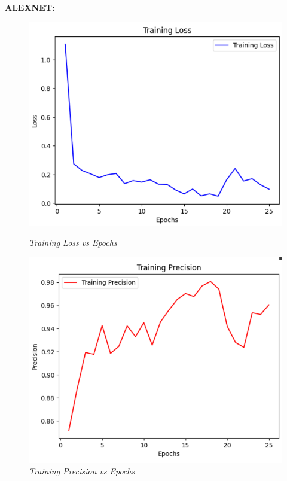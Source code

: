 \documentclass[12pt, a4paper]{report}
\begin{document}
\vspace{10cm}
\textbf{ALEXNET:}

\begin{figure}[htbp]
    \centering
    \begin{minipage}{0.4\textwidth}
        \centering
        \includegraphics[width=\linewidth]{report images/image17.png}
        \caption{\textit{Training Loss vs Epochs}}
    \end{minipage}%
    \hspace{0.05\textwidth} %
    \begin{minipage}{0.4\textwidth}
        \centering
        \includegraphics[width=\linewidth]{report images/image18.png}
        \caption{\textit{Training Precision vs Epochs}}
    \end{minipage}
\end{figure}
\end{document}

